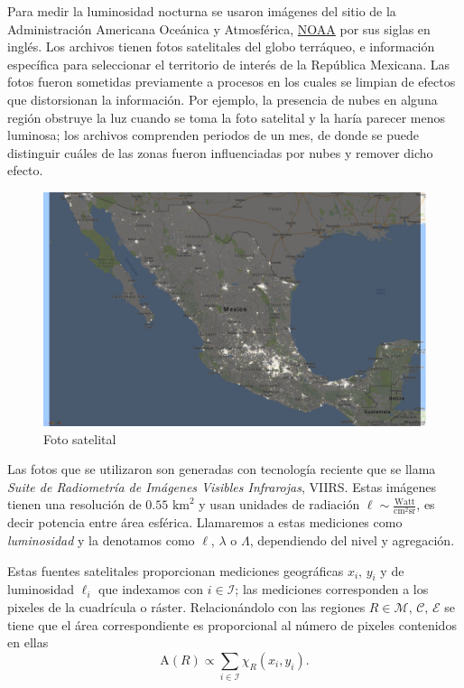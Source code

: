 \documentclass[]{article}
\begin{document}
Para medir la luminosidad nocturna se usaron imágenes del sitio de la
Administración Americana Oceánica y Atmosférica,
\href{http://ngdc.noaa.gov/eog/download.html}{NOAA} por sus siglas en
inglés. Los archivos tienen fotos satelitales del globo terráqueo, e
información específica para seleccionar el territorio de interés de la
República Mexicana. Las fotos fueron sometidas previamente a procesos en
los cuales se limpian de efectos que distorsionan la información. Por
ejemplo, la presencia de nubes en alguna región obstruye la luz cuando
se toma la foto satelital y la haría parecer menos luminosa; los
archivos comprenden periodos de un mes, de donde se puede distinguir
cuáles de las zonas fueron influenciadas por nubes y remover dicho
efecto.

\begin{figure}[htbp]
\centering
\includegraphics{ficha_figs/mexico_viirs.png}
\caption{Foto satelital}
\end{figure}

Las fotos que se utilizaron son generadas con tecnología reciente que se
llama \emph{Suite de Radiometría de Imágenes Visibles Infrarojas},
VIIRS. Estas imágenes tienen una resolución de \(\text{0.55 km}^2\) y
usan unidades de radiación
\(\ell \sim \frac{\text{Watt}}{\text{cm}^2 \text{sr}}\), es decir
potencia entre área esférica. Llamaremos a estas mediciones como
\emph{luminosidad} y la denotamos como \(\ell\), \(\lambda\) o
\(\Lambda\), dependiendo del nivel y agregación.

Estas fuentes satelitales proporcionan mediciones geográficas
\(x_i,\, y_i\) y de luminosidad \(\ell_i\) que indexamos con
\(i \in \mathcal{I}\); las mediciones corresponden a los pixeles de la
cuadrícula o ráster. Relacionándolo con las regiones
\(R \in \mathcal{M},\, \mathcal{C},\, \mathcal{E}\) se tiene que el área
correspondiente es proporcional al número de pixeles contenidos en ellas
\[ \mathrm{A}(R) \propto \sum\limits_{i \in \mathcal{I}} \chi_R(x_i,y_i).\]
\end{document}
